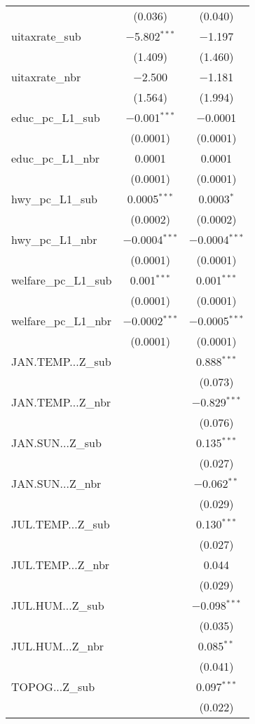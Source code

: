 \begin{table}[!htbp]
\begin{tabular}{@{\extracolsep{5pt}}lcc}
  & (0.036) & (0.040) \\ 
  uitaxrate\_sub & $-$5.802$^{***}$ & $-$1.197 \\ 
  & (1.409) & (1.460) \\ 
  uitaxrate\_nbr & $-$2.500 & $-$1.181 \\ 
  & (1.564) & (1.994) \\ 
  educ\_pc\_L1\_sub & $-$0.001$^{***}$ & $-$0.0001 \\ 
  & (0.0001) & (0.0001) \\ 
  educ\_pc\_L1\_nbr & 0.0001 & 0.0001 \\ 
  & (0.0001) & (0.0001) \\ 
  hwy\_pc\_L1\_sub & 0.0005$^{***}$ & 0.0003$^{*}$ \\ 
  & (0.0002) & (0.0002) \\ 
  hwy\_pc\_L1\_nbr & $-$0.0004$^{***}$ & $-$0.0004$^{***}$ \\ 
  & (0.0001) & (0.0001) \\ 
  welfare\_pc\_L1\_sub & 0.001$^{***}$ & 0.001$^{***}$ \\ 
  & (0.0001) & (0.0001) \\ 
  welfare\_pc\_L1\_nbr & $-$0.0002$^{***}$ & $-$0.0005$^{***}$ \\ 
  & (0.0001) & (0.0001) \\ 
  JAN.TEMP...Z\_sub &  & 0.888$^{***}$ \\ 
  &  & (0.073) \\ 
  JAN.TEMP...Z\_nbr &  & $-$0.829$^{***}$ \\ 
  &  & (0.076) \\ 
  JAN.SUN...Z\_sub &  & 0.135$^{***}$ \\ 
  &  & (0.027) \\ 
  JAN.SUN...Z\_nbr &  & $-$0.062$^{**}$ \\ 
  &  & (0.029) \\ 
  JUL.TEMP...Z\_sub &  & 0.130$^{***}$ \\ 
  &  & (0.027) \\ 
  JUL.TEMP...Z\_nbr &  & 0.044 \\ 
  &  & (0.029) \\ 
  JUL.HUM...Z\_sub &  & $-$0.098$^{***}$ \\ 
  &  & (0.035) \\ 
  JUL.HUM...Z\_nbr &  & 0.085$^{**}$ \\ 
  &  & (0.041) \\ 
  TOPOG...Z\_sub &  & 0.097$^{***}$ \\ 
  &  & (0.022) \\ 

\end{tabular}
\end{table}
